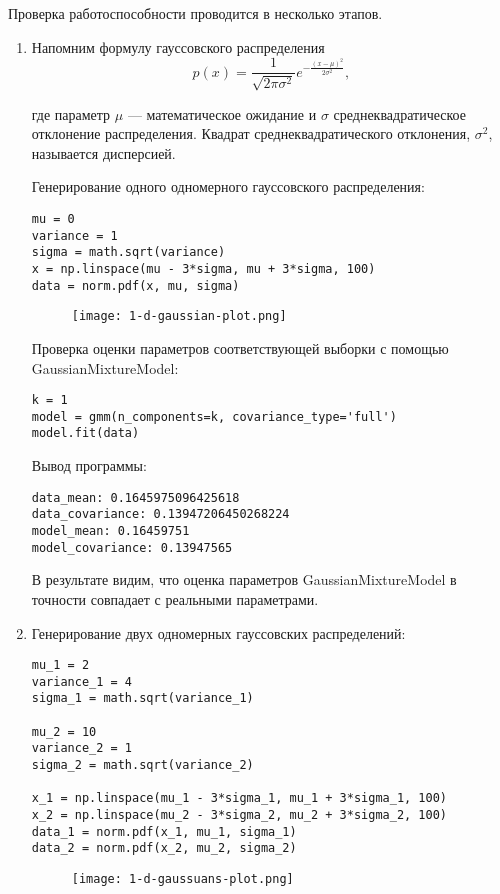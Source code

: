 Проверка работоспособности проводится в несколько этапов.

\begin{enumerate}
    \item {
        Напомним формулу гауссовского распределения
        $$ p(x) = \frac{1}{\sqrt{ 2 \pi \sigma^2 }} e^{ - \frac{ (x - \mu)^2 } {2 \sigma^2} },$$

        где параметр $\mu$ --- математическое ожидание и $\sigma$ среднеквадратическое отклонение распределения. Квадрат среднеквадратического отклонения, $\sigma^2$, называется дисперсией.

        Генерирование одного одномерного гауссовского распределения:
        \begin{verbatim}
mu = 0
variance = 1
sigma = math.sqrt(variance)
x = np.linspace(mu - 3*sigma, mu + 3*sigma, 100)
data = norm.pdf(x, mu, sigma)
        \end{verbatim}
        \begin{figure}[h]
            \begin{center}
                \texttt{[image: 1-d-gaussian-plot.png]}
                \caption{}
                \label{ris:experimcoded}
            \end{center}
        \end{figure}

        Проверка оценки параметров соответствующей выборки с помощью GaussianMixtureModel:
        \begin{verbatim}
k = 1
model = gmm(n_components=k, covariance_type='full')
model.fit(data)
        \end{verbatim}

        Вывод программы:
        \begin{verbatim}
data_mean: 0.1645975096425618
data_covariance: 0.13947206450268224
model_mean: 0.16459751
model_covariance: 0.13947565
        \end{verbatim}

        В результате видим, что оценка параметров GaussianMixtureModel в точности совпадает с реальными параметрами.
    }
    \item {
        Генерирование двух одномерных гауссовских распределений:
        \begin{verbatim}
mu_1 = 2
variance_1 = 4
sigma_1 = math.sqrt(variance_1)

mu_2 = 10
variance_2 = 1
sigma_2 = math.sqrt(variance_2)

x_1 = np.linspace(mu_1 - 3*sigma_1, mu_1 + 3*sigma_1, 100)
x_2 = np.linspace(mu_2 - 3*sigma_2, mu_2 + 3*sigma_2, 100)
data_1 = norm.pdf(x_1, mu_1, sigma_1)
data_2 = norm.pdf(x_2, mu_2, sigma_2)
        \end{verbatim}
        \begin{figure}[h]
            \begin{center}
                \texttt{[image: 1-d-gaussuans-plot.png]}
                \caption{}
                \label{ris:experimcoded}
            \end{center}
        \end{figure}

}
\end{enumerate}
